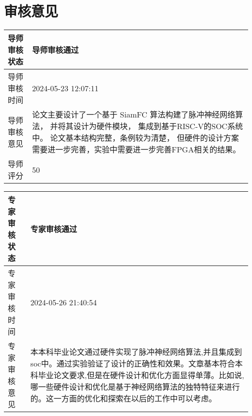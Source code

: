 \section*{审核意见}

\begin{table}[htbp]
    \centering
    \begin{tabular}{|p{3cm}|p{12cm}|}
        \hline
        导师审核状态 & 导师审核通过                                                                                                                  \\ \hline
        导师审核时间 & 2024-05-23 12:07:11                                                                                                     \\ \hline
        导师审核意见 & 论文主要设计了一个基于 SiamFC 算法构建了脉冲神经网络算法， 并将其设计为硬件模块， 集成到基于RISC-V的SOC系统中。 论文基本结构完整，条例较为清楚， 但硬件的设计方案需要进一步完善，实验中需要进一步完善FPGA相关的结果。 \\ \hline
        导师评分   & 50                                                                                                                      \\ \hline
    \end{tabular}
\end{table}

\vspace{1cm}

\begin{table}[htbp]
    \centering
    \begin{tabular}{|p{3cm}|p{12cm}|}
        \hline
        专家审核状态 & 专家审核通过                                                                                                                                    \\ \hline
        专家审核时间 & 2024-05-26 21:40:54                                                                                                                       \\ \hline
        专家审核意见 & 本本科毕业论文通过硬件实现了脉冲神经网络算法,并且集成到soc中。通过实验验证了设计的正确性和效果。文章基本符合本科毕业论文要求,但是在硬件设计和优化方面显得单薄。比如说,哪一些硬件设计和优化是基于神经网络算法的独特特征来进行的。这一方面的优化和探索在以后的工作中可以考虑。 \\ \hline
    \end{tabular}
\end{table}

\thispagestyle{empty}